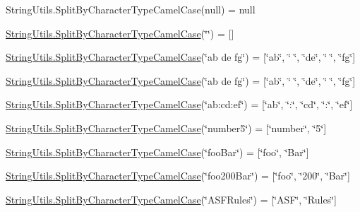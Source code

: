 String\+Utils.\+Split\+By\+Character\+Type\+Camel\+Case(null) = null 

\hyperlink{class_ultimate_1_1_utilities_1_1_string_utils_ac9d87e2397d6b9e9b490a87fd1e83a85}{String\+Utils.\+Split\+By\+Character\+Type\+Camel\+Case}(\char`\"{}\char`\"{}) = \mbox{[}\mbox{]} 

\hyperlink{class_ultimate_1_1_utilities_1_1_string_utils_ac9d87e2397d6b9e9b490a87fd1e83a85}{String\+Utils.\+Split\+By\+Character\+Type\+Camel\+Case}(\char`\"{}ab de fg\char`\"{}) = \mbox{[}\char`\"{}ab\char`\"{}, \char`\"{} \char`\"{}, \char`\"{}de\char`\"{}, \char`\"{} \char`\"{}, \char`\"{}fg\char`\"{}\mbox{]} 

\hyperlink{class_ultimate_1_1_utilities_1_1_string_utils_ac9d87e2397d6b9e9b490a87fd1e83a85}{String\+Utils.\+Split\+By\+Character\+Type\+Camel\+Case}(\char`\"{}ab   de fg\char`\"{}) = \mbox{[}\char`\"{}ab\char`\"{}, \char`\"{}   \char`\"{}, \char`\"{}de\char`\"{}, \char`\"{} \char`\"{}, \char`\"{}fg\char`\"{}\mbox{]} 

\hyperlink{class_ultimate_1_1_utilities_1_1_string_utils_ac9d87e2397d6b9e9b490a87fd1e83a85}{String\+Utils.\+Split\+By\+Character\+Type\+Camel\+Case}(\char`\"{}ab\+:cd\+:ef\char`\"{}) = \mbox{[}\char`\"{}ab\char`\"{}, \char`\"{}\+:\char`\"{}, \char`\"{}cd\char`\"{}, \char`\"{}\+:\char`\"{}, \char`\"{}ef\char`\"{}\mbox{]} 

\hyperlink{class_ultimate_1_1_utilities_1_1_string_utils_ac9d87e2397d6b9e9b490a87fd1e83a85}{String\+Utils.\+Split\+By\+Character\+Type\+Camel\+Case}(\char`\"{}number5\char`\"{}) = \mbox{[}\char`\"{}number\char`\"{}, \char`\"{}5\char`\"{}\mbox{]} 

\hyperlink{class_ultimate_1_1_utilities_1_1_string_utils_ac9d87e2397d6b9e9b490a87fd1e83a85}{String\+Utils.\+Split\+By\+Character\+Type\+Camel\+Case}(\char`\"{}foo\+Bar\char`\"{}) = \mbox{[}\char`\"{}foo\char`\"{}, \char`\"{}\+Bar\char`\"{}\mbox{]} 

\hyperlink{class_ultimate_1_1_utilities_1_1_string_utils_ac9d87e2397d6b9e9b490a87fd1e83a85}{String\+Utils.\+Split\+By\+Character\+Type\+Camel\+Case}(\char`\"{}foo200\+Bar\char`\"{}) = \mbox{[}\char`\"{}foo\char`\"{}, \char`\"{}200\char`\"{}, \char`\"{}\+Bar\char`\"{}\mbox{]} 

\hyperlink{class_ultimate_1_1_utilities_1_1_string_utils_ac9d87e2397d6b9e9b490a87fd1e83a85}{String\+Utils.\+Split\+By\+Character\+Type\+Camel\+Case}(\char`\"{}\+A\+S\+F\+Rules\char`\"{}) = \mbox{[}\char`\"{}\+A\+S\+F\char`\"{}, \char`\"{}\+Rules\char`\"{}\mbox{]} 


